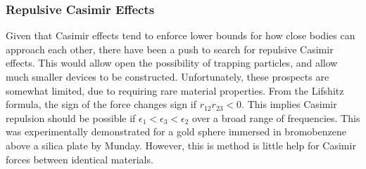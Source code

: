 





\subsubsection{Repulsive Casimir Effects}

Given that Casimir effects tend to enforce lower bounds for how close bodies can approach each other,
there have been a push to search for repulsive Casimir effects.  This would allow open the possibility
of trapping particles, and allow much smaller devices to be constructed.  
Unfortunately, these prospects are somewhat limited, due to requiring rare material properties.
From the Lifshitz formula, the sign of the force changes sign if $r_{12}r_{23}<0$.
This implies Casimir repulsion should be possible if $\epsilon_1<\epsilon_3<\epsilon_2$ over a broad range of frequencies.
This was experimentally demonstrated for a gold sphere immersed in bromobenzene above a silica plate
by Munday\etal\cite{Munday2009}.  However, this is method is little help for Casimir forces between
identical materials.  

